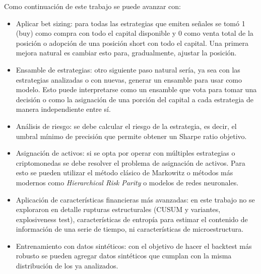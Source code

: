 Como continuación de este trabajo se puede avanzar con:
\begin{itemize}

\item Aplicar bet sizing: para todas las estrategias que emiten señales se tomó 1 (buy) como compra con todo el capital disponible y 0 como venta total de la posición o adopción de una posición short con todo el capital. Una primera mejora natural es cambiar esto para, gradualmente, ajustar la posición.

\item Ensamble de estrategias: otro siguiente paso natural sería, ya sea con las estrategias analizadas o con nuevas, generar un ensamble para usar como modelo. Esto puede interpretarse como un ensamble que vota para tomar una decisión o como la asignación de una porción del capital a cada estrategia de manera independiente entre sí.

\item Análisis de riesgo: se debe calcular el riesgo de la estrategia, es decir, el umbral mínimo de precisión que permite obtener un Sharpe ratio objetivo.

\item Asignación de activos: si se opta por operar con múltiples estrategias o criptomonedas se debe resolver el problema de asignación de activos. Para esto se pueden utilizar el método clásico de Markowitz o métodos más modernos como \textit{Hierarchical Risk Parity} \cite{LoP:2018} o modelos de redes neuronales.

\item Aplicación de características financieras más avanzadas: en este trabajo no se exploraron en detalle rupturas estructurales (CUSUM y variantes, explosiveness test), características de entropía para estimar el contenido de información de una serie de tiempo, ni características de microestructura.

\item Entrenamiento con datos sintéticos: con el objetivo de hacer el backtest más robusto se pueden agregar datos sintéticos que cumplan con la misma distribución de los ya analizados.

\end{itemize}
